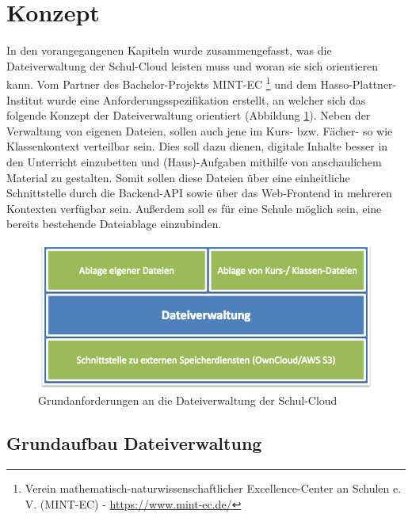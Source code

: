 \section{Konzept}
\label{sec:concept}

In den vorangegangenen Kapiteln wurde zusammengefasst, was die Dateiverwaltung der Schul-Cloud leisten muss und woran sie sich orientieren kann. Vom Partner des Bachelor-Projekts MINT-EC \footnote{Verein mathematisch-naturwissenschaftlicher Excellence-Center an Schulen e. V. (MINT-EC) - \url{https://www.mint-ec.de/}}  und dem Hasso-Plattner-Institut wurde eine Anforderungsspezifikation erstellt, an welcher sich das folgende Konzept der Dateiverwaltung orientiert (Abbildung \ref{fig:anforderungen}). Neben der Verwaltung von eigenen Dateien, sollen auch  jene im Kurs- bzw. Fächer- so wie Klassenkontext verteilbar sein. Dies soll dazu dienen, digitale Inhalte besser in den Unterricht einzubetten und (Haus)-Aufgaben mithilfe von anschaulichem Material zu gestalten. Somit sollen diese Dateien über eine einheitliche Schnittstelle durch die Backend-API sowie über das Web-Frontend in mehreren Kontexten verfügbar sein. Außerdem soll es für eine Schule möglich sein, eine bereits bestehende Dateiablage einzubinden. 

\begin{figure}[H]
	\centering
	\includegraphics[width=0.8\linewidth]{images/AnforderungenDateiverwaltung}
	\caption[Caption for concept]{Grundanforderungen an die Dateiverwaltung der Schul-Cloud\footnotemark}
	\label{fig:anforderungen}
\end{figure}


\subsection{Grundaufbau Dateiverwaltung}

